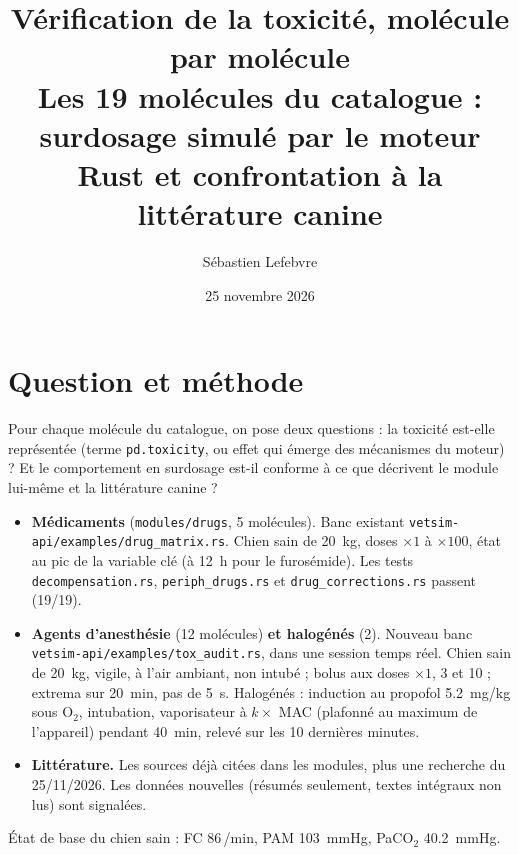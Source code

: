 \documentclass[10pt,a4paper]{article}
\title{Vérification de la toxicité, molécule par molécule\\[0.3em]
\large Les 19 molécules du catalogue : surdosage simulé par le moteur Rust et confrontation à la littérature canine}
\author{Sébastien Lefebvre}
\date{25 novembre 2026}
\newcommand{\cmd}[1]{\texttt{#1}}
\begin{document}
\sloppy
\maketitle

\begin{center}
\end{center}

\section{Question et méthode}

Pour chaque molécule du catalogue, on pose deux questions : la toxicité est-elle représentée (terme \cmd{pd.toxicity}, ou effet qui émerge des mécanismes du moteur) ? Et le comportement en surdosage est-il conforme à ce que décrivent le module lui-même et la littérature canine ?

\begin{itemize}
\item \textbf{Médicaments} (\cmd{modules/drugs}, 5 molécules). Banc existant \cmd{vetsim-api/examples/drug\_matrix.rs}. Chien sain de \SI{20}{kg}, doses $\times 1$ à $\times 100$, état au pic de la variable clé (à \SI{12}{h} pour le furosémide). Les tests \cmd{decompensation.rs}, \cmd{periph\_drugs.rs} et \cmd{drug\_corrections.rs} passent (19/19).
\item \textbf{Agents d'anesthésie} (12 molécules) \textbf{et halogénés} (2). Nouveau banc \cmd{vetsim-api/examples/tox\_audit.rs}, dans une session temps réel. Chien sain de \SI{20}{kg}, vigile, à l'air ambiant, non intubé ; bolus aux doses $\times 1$, 3 et 10 ; extrema sur \SI{20}{min}, pas de \SI{5}{s}. Halogénés : induction au propofol \SI{5,2}{mg/kg} sous O$_2$, intubation, vaporisateur à $k \times$ MAC (plafonné au maximum de l'appareil) pendant \SI{40}{min}, relevé sur les 10 dernières minutes.
\item \textbf{Littérature.} Les sources déjà citées dans les modules, plus une recherche du 25/11/2026. Les données nouvelles (résumés seulement, textes intégraux non lus) sont signalées.
\end{itemize}

État de base du chien sain : FC 86\,/min, PAM \SI{103}{mmHg}, PaCO$_2$ \SI{40,2}{mmHg}.
\end{document}
